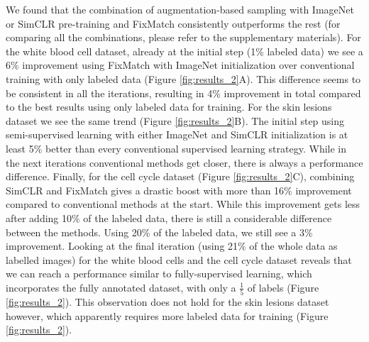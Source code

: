 We found that the combination of augmentation-based sampling with ImageNet or SimCLR pre-training and FixMatch consistently outperforms the rest (for comparing all the combinations, please refer to the supplementary materials).
For the white blood cell dataset, already at the initial step (1\% labeled data) we see a 6\% improvement using FixMatch with ImageNet initialization over conventional training with only labeled data (Figure \ref{fig:results_2}A). This difference seems to be consistent in all the iterations, resulting in 4\% improvement in total compared to the best results using only labeled data for training. For the skin lesions dataset we see the same trend (Figure \ref{fig:results_2}B). The initial step using semi-supervised learning with either ImageNet and SimCLR initialization is at least 5\% better than every conventional supervised learning strategy. While in the next iterations conventional methods get closer, there is always a performance difference. Finally, for the cell cycle dataset (Figure \ref{fig:results_2}C), combining SimCLR and FixMatch gives a drastic boost with more than 16\% improvement compared to conventional methods at the start. While this improvement gets less after adding 10\% of the labeled data, there is still a considerable difference between the methods. Using 20\% of the labeled data, we still see a 3\% improvement. 
Looking at the final iteration (using 21\% of the whole data as labelled images) for the white blood cells and the cell cycle dataset reveals that we can reach a performance similar to fully-supervised learning, which incorporates the fully annotated dataset, with only a $\frac{1}{5}$ of labels (Figure \ref{fig:results_2}). This observation does not hold for the skin lesions dataset however, which apparently requires more labeled data for training (Figure \ref{fig:results_2}). 

